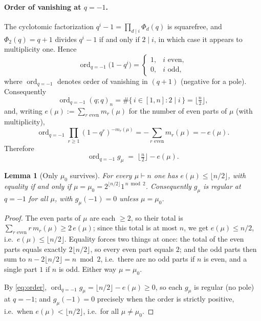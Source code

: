 \documentclass[11pt]{article}
\newtheorem{lemma}{Lemma}
\theoremstyle{definition}
\DeclareMathOperator{\ord}{ord}
\begin{document}
\paragraph{Order of vanishing at $q=-1$.}
The cyclotomic factorization $q^i-1=\prod_{d\mid i}\Phi_d(q)$ is squarefree, and
$\Phi_2(q)=q+1$ divides $q^i-1$ if and only if $2\mid i$, in which case it appears
to multiplicity one.  Hence
\[
   \ord_{q=-1}\bigl(1-q^i\bigr)=
   \begin{cases}1,& i\text{ even},\\[2pt] 0,& i\text{ odd},\end{cases}
\]
where $\ord_{q=-1}$ denotes order of vanishing in $(q+1)$ (negative for a pole).
Consequently
\[
   \ord_{q=-1}(q;q)_n=\#\{\,i\in[1,n]: 2\mid i\,\}=\Big\lfloor\tfrac n2\Big\rfloor,
\]
and, writing $e(\mu):=\sum_{r\text{ even}} m_r(\mu)$ for the number of even parts of
$\mu$ (with multiplicity),
\[
   \ord_{q=-1}\prod_{r\ge1}(1-q^r)^{-m_r(\mu)}
   =-\sum_{r\text{ even}} m_r(\mu)=-\,e(\mu).
\]
Therefore
\begin{equation}\label{eq:order}
   \ord_{q=-1} g_\mu \;=\; \Big\lfloor\tfrac n2\Big\rfloor-e(\mu).
\end{equation}

\begin{lemma}[Only $\mu_0$ survives]\label{lem:sieve}
For every $\mu\vdash n$ one has $e(\mu)\le\lfloor n/2\rfloor$, with equality if and
only if $\mu=\mu_0=2^{\lfloor n/2\rfloor}1^{\,n\bmod 2}$.  Consequently
$g_\mu$ is regular at $q=-1$ for all $\mu$, with $g_\mu(-1)=0$ unless $\mu=\mu_0$.
\end{lemma}

\begin{proof}
The even parts of $\mu$ are each $\ge 2$, so their total is
$\sum_{r\text{ even}} r\,m_r(\mu)\ge 2\,e(\mu)$; since this total is at most
$n$, we get $e(\mu)\le n/2$, i.e.\ $e(\mu)\le\lfloor n/2\rfloor$.  Equality forces
two things at once: the total of the even parts equals exactly $2\lfloor n/2\rfloor$,
so every even part equals $2$; and the odd parts then sum to
$n-2\lfloor n/2\rfloor=n\bmod 2$, i.e.\ there are no odd parts if $n$ is even, and a
single part $1$ if $n$ is odd.  Either way $\mu=\mu_0$.

By \eqref{eq:order}, $\ord_{q=-1}g_\mu=\lfloor n/2\rfloor-e(\mu)\ge 0$, so each
$g_\mu$ is regular (no pole) at $q=-1$; and $g_\mu(-1)=0$ precisely when the order
is strictly positive, i.e.\ when $e(\mu)<\lfloor n/2\rfloor$, i.e.\ for all
$\mu\neq\mu_0$.
\end{proof}
\end{document}
